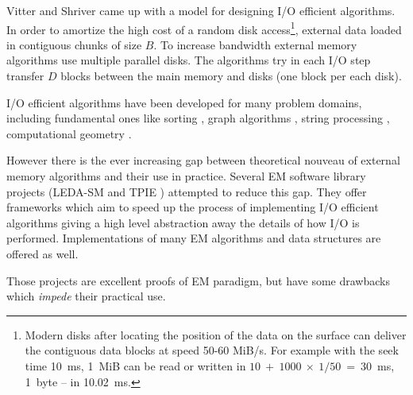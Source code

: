 \documentclass[twoside]{book}
\begin{document}
Vitter and Shriver \cite{VitShr94both} came up with a model for designing I/O
efficient algorithms. In order to amortize the high cost of a random
disk access\footnote{Modern disks after locating the position of the
data on the surface can deliver the contiguous data blocks at speed
50-60 MiB/s. For example with the seek time 10~ms, 1~MiB can be read or
written in $10~+~1000~\times~1/50~=~30$~ms, 1~byte -- in 10.02~ms.},
external data loaded in contiguous chunks of size $B$. To increase
bandwidth external memory algorithms use multiple parallel disks. The
algorithms try in each I/O step transfer $D$ blocks between the main
memory and disks (one block per each disk).


I/O efficient algorithms have been developed for many
problem domains, including fundamental ones like sorting \cite{},
graph algorithms \cite{}, string processing \cite{}, computational
geometry \cite{}. 

However there is the ever increasing gap between theoretical
nouveau of external memory algorithms and their use in practice.   
Several EM software library projects (LEDA-SM \cite{CraMeh99} and TPIE
\cite{APV02}) attempted to 
reduce this gap. They offer frameworks which aim to speed up the
process of implementing I/O efficient algorithms giving a high level
abstraction away the details of how I/O is performed. Implementations
of many EM algorithms and data structures are offered as well.

Those projects are excellent proofs of EM paradigm, but have
some drawbacks which \emph{impede} their practical use.
\end{document}
